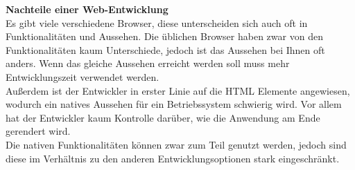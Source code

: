 \documentclass[ngerman]{article}
\begin{document}
    \textbf{Nachteile einer Web-Entwicklung}\\
    Es gibt viele verschiedene Browser, diese unterscheiden sich auch oft in Funktionalitäten und Aussehen. Die üblichen Browser haben zwar von den Funktionalitäten kaum Unterschiede, jedoch ist das Aussehen bei Ihnen oft anders. Wenn das gleiche Aussehen erreicht werden soll muss mehr Entwicklungszeit verwendet werden. \cite{Native app vs Web app: Multi-criteria decision-making for optimised mobile solution}\\
    Außerdem ist der Entwickler in erster Linie auf die HTML Elemente angewiesen, wodurch ein natives Aussehen für ein Betriebssystem schwierig wird. Vor allem hat der Entwickler kaum Kontrolle darüber, wie die Anwendung am Ende gerendert wird.\\
    Die nativen Funktionalitäten können zwar zum Teil genutzt werden, jedoch sind diese im Verhältnis zu den anderen Entwicklungsoptionen stark eingeschränkt. \cite{Cross-platform development of smartphone applications: An evaluation of React Native}
\end{document}
